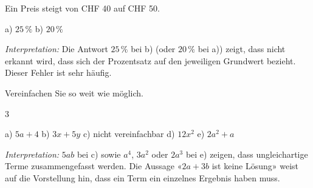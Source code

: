 \documentclass[11pt]{exam}
\newcommand{\aufgabe}[1]{%
  \needspace{8\baselineskip}%
  \renewcommand{\questionlabel}{\textbf{#1}}%
  \question}
\newcommand{\raum}[1]{\ifprintanswers\else\fillwithgrid{#1}\fi}
\newcommand{\diagnose}[1]{\par\smallskip\textit{Interpretation:} #1}
\begin{document}
\begin{questions}
\aufgabe{4.4}
Ein Preis steigt von CHF 40 auf CHF 50.
\begin{solution}
  a) $25\,\%$ \qquad b) $20\,\%$
  \diagnose{Die Antwort $25\,\%$ bei b) (oder $20\,\%$ bei a)) zeigt, dass
  nicht erkannt wird, dass sich der Prozentsatz auf den jeweiligen Grundwert
  bezieht. Dieser Fehler ist sehr häufig.}
\end{solution}
\raum{3cm}

\aufgabe{5.3}
Vereinfachen Sie so weit wie möglich.
\begin{multicols}{3}
\end{multicols}
\begin{solution}
  a) $5a + 4$ \quad b) $3x + 5y$ \quad c) nicht vereinfachbar \quad
  d) $12x^2$ \quad e) $2a^2 + a$
  \diagnose{$5ab$ bei c) sowie $a^4$, $3a^2$ oder $2a^3$ bei e) zeigen, dass
  ungleichartige Terme zusammengefasst werden. Die Aussage «$2a + 3b$ ist keine
  Lösung» weist auf die Vorstellung hin, dass ein Term ein einzelnes Ergebnis
  haben muss.}
\end{solution}
\raum{3cm}


\end{questions}
\end{document}
